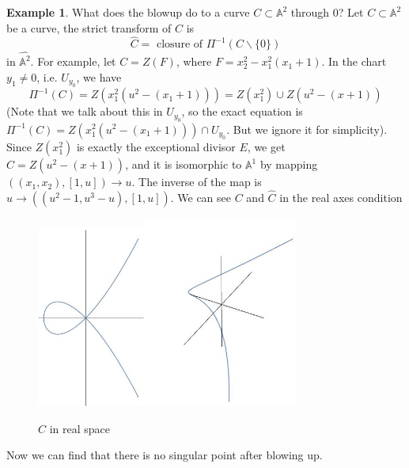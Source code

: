 \documentclass{amsart}
\theoremstyle{plain}
\theoremstyle{definition}
\newtheorem{example}{Example}
\theoremstyle{remark}
\numberwithin{equation}{section}
\begin{document}
 \begin{example}
 	What does the blowup do to a curve $ C\subset \mathbb{A}^2 $ through $ 0 $? Let $ C\subset \mathbb{A}^2 $ be a curve, the strict transform of $ C $ is $$
 	 \hat{C}=\text{ closure of } \Pi^{-1}(C\backslash\{ 0 \}) 
 	$$
 	in $ \hat{\mathbb{A}^2} $. For example, let $ C=Z(F) $, where $ F=x_2^2-x_1^2(x_1+1) $. In the chart $ y_1\neq 0 $, i.e. $ U_{y_0} $, we have 
 	$$
 	\Pi^{-1}(C)=Z(x_1^2(u^2-(x_1+1)))=Z(x_1^2)\cup Z(u^2-(x+1))
 	$$
 	(Note that we talk about this in $ U_{y_0} $, so the exact equation is $ \Pi^{-1}(C)= Z(x_1^2(u^2-(x_1+1)))\cap U_{y_0} $. But we ignore it for simplicity).
 	Since $ Z(x_1^2) $ is exactly the exceptional divisor $ E $, we get $ \hat{C}=Z(u^2-(x+1)) $, and it is isomorphic to $ \mathbb{A}^1 $ by mapping $ ((x_1,x_2),[1,u])\to u $. The inverse of the map is $ u\to ((u^2-1,u^3-u),[1,u]) $. We can see $ C $ and $ \hat{C} $ in the real axes condition
 \begin{figure}[htbp]
 	\centering\includegraphics[width=1.4in]{2dimage.jpg}\includegraphics[width=2.0in]{3dimage.jpg}
 	\caption{$ \hat{C}$  in real space }\label{fig:1}
 \end{figure}
 Now we can find that there is no singular point after blowing up.
  \end{example} 
 
\end{document}

